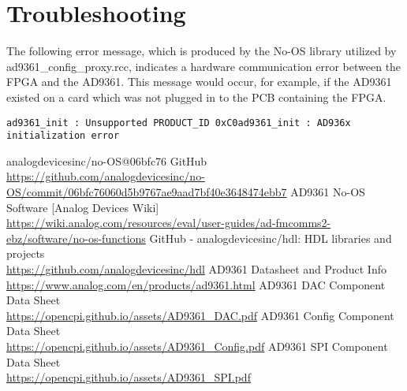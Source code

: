 \documentclass{article}
\def\comp{ad9361\_config\_proxy}
\begin{document}
\section*{Troubleshooting}
The following error message, which is produced by the No-OS library\cite{no_os} utilized by \comp{}.rcc, indicates a hardware communication error between the FPGA and the AD9361. This message would occur, for example, if the AD9361 existed on a card which was not plugged in to the PCB containing the FPGA.
\begin{lstlisting}
ad9361_init : Unsupported PRODUCT_ID 0xC0ad9361_init : AD936x initialization error
\end{lstlisting}

\begin{thebibliography}{1}

 analogdevicesinc/no-OS@06bfc76 GitHub\\
\url{https://github.com/analogdevicesinc/no-OS/commit/06bfc76060d5b9767ae9aad7bf40e3648474ebb7}
 AD9361 No-OS Software [Analog Devices Wiki]\\
\url{https://wiki.analog.com/resources/eval/user-guides/ad-fmcomms2-ebz/software/no-os-functions}
 GitHub - analogdevicesinc/hdl: HDL libraries and projects \\
\url{https://github.com/analogdevicesinc/hdl}
 AD9361 Datasheet and Product Info \\
\url{https://www.analog.com/en/products/ad9361.html}
 AD9361 DAC Component Data Sheet \\
\url{https://opencpi.github.io/assets/AD9361_DAC.pdf}
 AD9361 Config Component Data Sheet \\
\url{https://opencpi.github.io/assets/AD9361_Config.pdf}
 AD9361 SPI Component Data Sheet \\
\url{https://opencpi.github.io/assets/AD9361_SPI.pdf}

\end{thebibliography}
\end{document}
